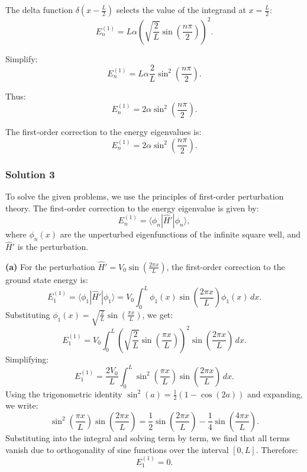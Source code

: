 \documentclass{article}
\begin{document}
The delta function \(\delta\left(x - \frac{L}{2}\right)\) selects the value of the integrand at \(x = \frac{L}{2}\):
\[
E_n^{(1)} = L \alpha \left(\sqrt{\frac{2}{L}} \sin\left(\frac{n \pi}{2}\right)\right)^2.
\]

Simplify:
\[
E_n^{(1)} = L \alpha \frac{2}{L} \sin^2\left(\frac{n \pi}{2}\right).
\]

Thus:
\[
E_n^{(1)} = 2 \alpha \sin^2\left(\frac{n \pi}{2}\right).
\]

The first-order correction to the energy eigenvalues is:
\[
E_n^{(1)} = 2 \alpha \sin^2\left(\frac{n \pi}{2}\right).
\]

\subsubsection{Solution 3}
To solve the given problems, we use the principles of first-order perturbation theory. The first-order correction to the energy eigenvalue is given by:
\[
E_n^{(1)} = \langle \phi_n | \hat{H}' | \phi_n \rangle,
\]
where \(\phi_n(x)\) are the unperturbed eigenfunctions of the infinite square well, and \(\hat{H}'\) is the perturbation.

\textbf{(a)} For the perturbation \(\hat{H}' = V_0 \sin\left(\frac{2\pi x}{L}\right)\), the first-order correction to the ground state energy is:
\[
E_1^{(1)} = \langle \phi_1 | \hat{H}' | \phi_1 \rangle = V_0 \int_0^L \phi_1(x) \sin\left(\frac{2\pi x}{L}\right) \phi_1(x) \, dx.
\]
Substituting \(\phi_1(x) = \sqrt{\frac{2}{L}} \sin\left(\frac{\pi x}{L}\right)\), we get:
\[
E_1^{(1)} = V_0 \int_0^L \left(\sqrt{\frac{2}{L}} \sin\left(\frac{\pi x}{L}\right)\right)^2 \sin\left(\frac{2\pi x}{L}\right) \, dx.
\]
Simplifying:
\[
E_1^{(1)} = \frac{2 V_0}{L} \int_0^L \sin^2\left(\frac{\pi x}{L}\right) \sin\left(\frac{2\pi x}{L}\right) \, dx.
\]
Using the trigonometric identity \(\sin^2(a) = \frac{1}{2} (1 - \cos(2a))\) and expanding, we write:
\[
\sin^2\left(\frac{\pi x}{L}\right) \sin\left(\frac{2\pi x}{L}\right) = \frac{1}{2} \sin\left(\frac{2\pi x}{L}\right) - \frac{1}{4} \sin\left(\frac{4\pi x}{L}\right).
\]
Substituting into the integral and solving term by term, we find that all terms vanish due to orthogonality of sine functions over the interval \([0, L]\). Therefore:
\[
E_1^{(1)} = 0.
\]
\end{document}
